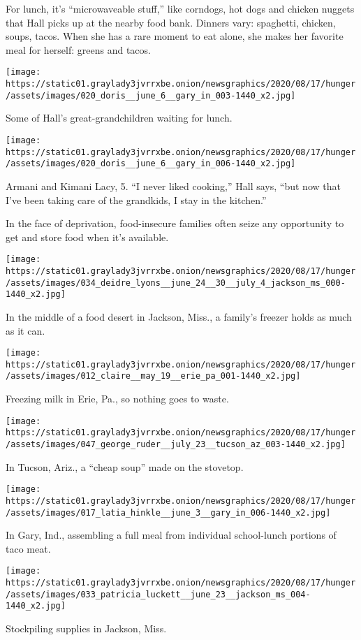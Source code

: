 For lunch, it's ``microwaveable stuff,'' like corndogs, hot dogs and
chicken nuggets that Hall picks up at the nearby food bank. Dinners
vary: spaghetti, chicken, soups, tacos. When she has a rare moment to
eat alone, she makes her favorite meal for herself: greens and tacos.

\texttt{[image: https://static01.graylady3jvrrxbe.onion/newsgraphics/2020/08/17/hunger/assets/images/020\_doris\_\_june\_6\_\_gary\_in\_003-1440\_x2.jpg]}

Some of Hall's great-grandchildren waiting for lunch.

\texttt{[image: https://static01.graylady3jvrrxbe.onion/newsgraphics/2020/08/17/hunger/assets/images/020\_doris\_\_june\_6\_\_gary\_in\_006-1440\_x2.jpg]}

Armani and Kimani Lacy, 5. ``I never liked cooking,'' Hall says, ``but
now that I've been taking care of the grandkids, I stay in the
kitchen.''

In the face of deprivation, food-insecure families often seize any
opportunity to get and store food when it's available.

\texttt{[image: https://static01.graylady3jvrrxbe.onion/newsgraphics/2020/08/17/hunger/assets/images/034\_deidre\_lyons\_\_june\_24\_\_30\_\_july\_4\_jackson\_ms\_000-1440\_x2.jpg]}

In the middle of a food desert in Jackson, Miss., a family's freezer
holds as much as it can.

\texttt{[image: https://static01.graylady3jvrrxbe.onion/newsgraphics/2020/08/17/hunger/assets/images/012\_claire\_\_may\_19\_\_erie\_pa\_001-1440\_x2.jpg]}

Freezing milk in Erie, Pa., so nothing goes to waste.

\texttt{[image: https://static01.graylady3jvrrxbe.onion/newsgraphics/2020/08/17/hunger/assets/images/047\_george\_ruder\_\_july\_23\_\_tucson\_az\_003-1440\_x2.jpg]}

In Tucson, Ariz., a ``cheap soup'' made on the stovetop.

\texttt{[image: https://static01.graylady3jvrrxbe.onion/newsgraphics/2020/08/17/hunger/assets/images/017\_latia\_hinkle\_\_june\_3\_\_gary\_in\_006-1440\_x2.jpg]}

In Gary, Ind., assembling a full meal from individual school-lunch
portions of taco meat.

\texttt{[image: https://static01.graylady3jvrrxbe.onion/newsgraphics/2020/08/17/hunger/assets/images/033\_patricia\_luckett\_\_june\_23\_\_jackson\_ms\_004-1440\_x2.jpg]}

Stockpiling supplies in Jackson, Miss.

